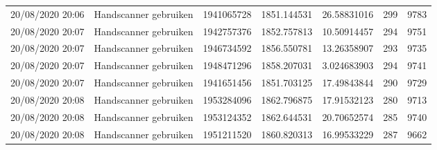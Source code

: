 \begin{tiny}
\begin{longtable}{lllllll}
    20/08/2020 20:06 & Handscanner gebruiken & 1941065728        & 1851.144531 & 26.58831016           & 299              & 9783             \\
    20/08/2020 20:07 & Handscanner gebruiken & 1942757376        & 1852.757813 & 10.50914457           & 294              & 9751             \\
    20/08/2020 20:07 & Handscanner gebruiken & 1946734592        & 1856.550781 & 13.26358907           & 293              & 9735             \\
    20/08/2020 20:07 & Handscanner gebruiken & 1948471296        & 1858.207031 & 3.024683903           & 294              & 9741             \\
    20/08/2020 20:07 & Handscanner gebruiken & 1941651456        & 1851.703125 & 17.49843844           & 290              & 9729             \\
    20/08/2020 20:08 & Handscanner gebruiken & 1953284096        & 1862.796875 & 17.91532123           & 280              & 9713             \\
    20/08/2020 20:08 & Handscanner gebruiken & 1953124352        & 1862.644531 & 20.70652574           & 285              & 9740             \\
    20/08/2020 20:08 & Handscanner gebruiken & 1951211520        & 1860.820313 & 16.99533229           & 287              & 9662            
\end{longtable}
\end{tiny}